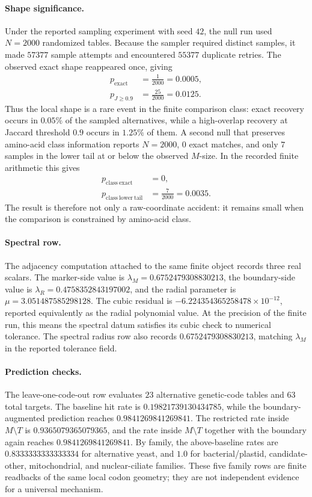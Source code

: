 \paragraph{Shape significance.}
Under the reported sampling experiment with seed $42$, the null run used $N=2000$ randomized tables.  Because the sampler required distinct samples, it made $57377$ sample attempts and encountered $55377$ duplicate retries.  The observed exact shape reappeared once, giving
$$
\begin{aligned}
p_{\mathrm{exact}}&=\frac{1}{2000}=0.0005,\\
p_{J\geq 0.9}&=\frac{25}{2000}=0.0125.
\end{aligned}
$$
Thus the local shape is a rare event in the finite comparison class: exact recovery occurs in $0.05\%$ of the sampled alternatives, while a high-overlap recovery at Jaccard threshold $0.9$ occurs in $1.25\%$ of them.  A second null that preserves amino-acid class information reports $N=2000$, $0$ exact matches, and only $7$ samples in the lower tail at or below the observed $M$-size.  In the recorded finite arithmetic this gives
$$
\begin{aligned}
p_{\mathrm{class\ exact}}&=0,\\
p_{\mathrm{class\ lower\ tail}}&=\frac{7}{2000}=0.0035.
\end{aligned}
$$
The result is therefore not only a raw-coordinate accident: it remains small when the comparison is constrained by amino-acid class.

\paragraph{Spectral row.}
The adjacency computation attached to the same finite object records three real scalars.  The marker-side value is $\lambda_M=0.6752479308830213$, the boundary-side value is $\lambda_R=0.4758352843197002$, and the radial parameter is $\mu=3.051487585298128$.  The cubic residual is $-6.224354365258478\times 10^{-12}$, reported equivalently as the radial polynomial value.  At the precision of the finite run, this means the spectral datum satisfies its cubic check to numerical tolerance.  The spectral radius row also records $0.6752479308830213$, matching $\lambda_M$ in the reported tolerance field.

\paragraph{Prediction checks.}
The leave-one-code-out row evaluates $23$ alternative genetic-code tables and $63$ total targets.  The baseline hit rate is $0.19821739130434785$, while the boundary-augmented prediction reaches $0.9841269841269841$.  The restricted rate inside $M\setminus T$ is $0.9365079365079365$, and the rate inside $M\setminus T$ together with the boundary again reaches $0.9841269841269841$.  By family, the above-baseline rates are $0.8333333333333334$ for alternative yeast, and $1.0$ for bacterial/plastid, candidate-other, mitochondrial, and nuclear-ciliate families.  These five family rows are finite readbacks of the same local codon geometry; they are not independent evidence for a universal mechanism.

